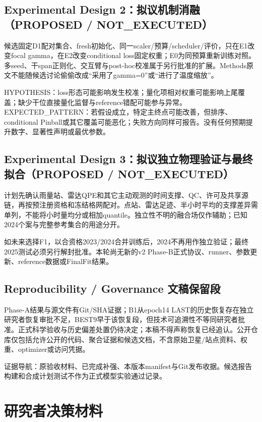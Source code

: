 \documentclass[UTF8,fontset=fandol,10pt]{ctexart}
\begin{document}
\subsection{Experimental Design 2：拟议机制消融（PROPOSED /\allowbreak{} NOT\_\allowbreak{}EXECUTED）}

候选固定D1配对集合、fresh初始化、同一scaler/\allowbreak{}预算/\allowbreak{}scheduler/\allowbreak{}评价，只在E1改变focal gamma，在E2改变conditional loss固定权重；E0为同预算重新训练对照。多seed、干span正则化、交互臂与post-hoc校准属于另行批准的扩展。Methods原文不能随候选讨论偷偷改成“采用了gamma=0”或“进行了温度缩放”。

HYPOTHESIS：loss形态可能影响发生校准；量化项相对权重可能影响上尾覆盖；缺少干位直接量化监督与reference错配可能参与异常。EXPECTED\_\allowbreak{}PATTERN：若假设成立，特定主终点可能改善，但排序、conditional Pinball或其它覆盖可能恶化；失败方向同样可报告。没有任何预期提升数字、显著性声明或最优参数。

\subsection{Experimental Design 3：拟议独立物理验证与最终拟合（PROPOSED /\allowbreak{} NOT\_\allowbreak{}EXECUTED）}

计划先确认雨量站、雷达QPE和其它主动观测的时间支撑、QC、许可及共享源链，再按预注册资格和冻结格网配对。点站、雷达足迹、半小时平均的支撑差异需单列，不能将小时量均分或相加quantile。独立性不明的融合场仅作辅助；已知2024个案与完整参考集合的用途分开。

如未来选择F1，以合资格2023/\allowbreak{}2024合并训练后，2024不再用作独立验证；最终2025测试必须另行解封批准。本轮尚无新的v2 Phase-B正式协议、runner、参数更新、reference数据或FinalFit结果。

\subsection{Reproducibility /\allowbreak{} Governance 文稿保留段}

Phase-A结果与源文件有Git/\allowbreak{}SHA证据；B1从epoch14 LAST的历史恢复存在独立研究者恢复审批不足，BEST9早于该恢复段，但技术可追溯性不等同研究者批准。正式科学验收与历史偏差处置仍待决定；本稿不得声称恢复已经追认。公开仓库仅包括允许公开的代码、聚合证据和候选文档，不含原始卫星/\allowbreak{}站点资料、权重、optimizer或访问凭据。

证据导航：原验收材料、已完成补强、本版本manifest与Git发布收据。候选报告构建和合成计划测试不作为正式模型实验通过记录。
\clearpage\section{研究者决策材料}
\end{document}
